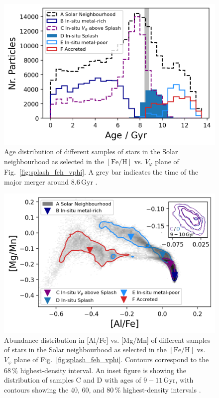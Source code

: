 \documentclass[fleqn,usenatbib]{mnras}
\begin{document}
\begin{figure}
    \centering
    \includegraphics[width=\columnwidth]{figures/splash_age.png}
    \caption{Age distribution of different samples of stars in the Solar neighbourhood as selected in the $\mathrm{[Fe/H]}$ vs. $V_\varphi$ plane of Fig.~\ref{fig:splash_feh_vphi}. A grey bar indicates the time of the major merger around $8.6\,\mathrm{Gyr}$ \href{https://github.com/svenbuder/golden_thread_II/tree/main/figures}{\faGithub}.}
    \label{fig:splash_age}
\end{figure}

\begin{figure}
    \centering
    \includegraphics[width=\columnwidth]{figures/splash_alfe_mgmn.png}
    \caption{Abundance distribution in [Al/Fe] vs. [Mg/Mn] of different samples of stars in the Solar neighbourhood as selected in the $\mathrm{[Fe/H]}$ vs. $V_\varphi$ plane of Fig.~\ref{fig:splash_feh_vphi}. Contours correspond to the 68\,\% highest-density interval. An inset figure is showing the distribution of samples C and D with ages of $9-11\,\mathrm{Gyr}$, with contours showing the 40, 60, and 80\,\% highest-density intervals \href{https://github.com/svenbuder/golden_thread_II/tree/main/figures}{\faGithub}.}
    \label{fig:splash_alfe_mgmn}
\end{figure}
\end{document}
